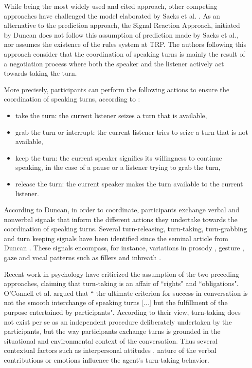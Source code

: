 While being the most widely used and cited approach, other competing approaches have challenged the model elaborated by Sacks et al. \citep{sacks_simplest_1974}.
As an alternative to the prediction approach, the Signal Reaction Approach, initiated by Duncan \citep{duncan_signals_1972} does not follow this assumption of prediction made by Sacks et al., nor assumes the existence of the rules system at TRP. 
The authors following this approach consider that the coordination of speaking turns is mainly the result of a negotiation process where both the speaker and the listener actively act towards taking the turn.

More precisely, participants can perform the following actions to ensure the coordination of speaking turns, according to \citep{bunt_dimensions_2006}:
\begin{itemize}
\item take the turn: the current listener seizes a turn that is available,
\item grab the turn or interrupt: the current listener tries to seize a turn that is not available,
\item keep the turn: the current speaker signifies its willingness to continue speaking, in the case of a pause or a listener trying to grab the turn,
\item release the turn: the current speaker makes the turn available to the current listener.
\end{itemize}

According to Duncan, in order to coordinate, participants exchange verbal and nonverbal signals that inform the different actions they undertake towards the coordination of speaking turns. 
Several turn-releasing, turn-taking, turn-grabbing and turn keeping signals have been identified since the seminal article from Duncan \citep{duncan_signals_1972}. These signals encompass, for instance, variations in prosody \citep{duncan_signals_1972,gravano_turn-taking_2011,hjalmarsson_additive_2011}, gesture \citep{duncan_signals_1972,mondada_multimodal_2007}, gaze \citep{kendon_functions_1967,novick_coordinating_1996,oertel_gaze_2013} and vocal patterns 
such as fillers \citep{benus_pragmatic_2011} and inbreath \citep{torreira_breathing_2015}.  

Recent work in psychology have criticized
the assumption of the two preceding approaches, claiming that turn-taking is an affair of ``rights" and ``obligations". O'Connell et al.\citep{oconnell_turn-taking_1990} argued that `` the ultimate criterion for success in conversation is not the smooth interchange of speaking
turns [...] but the fulfillment of the purpose entertained
by participants". According to their view, turn-taking
does not exist per se as an independent procedure deliberately
undertaken by the participants, but the way
participants exchange turns is grounded in the situational
and environmental context of the conversation.
Thus several contextual factors such as interpersonal attitudes \citep{ter_maat_how_2010}, nature of the verbal contributions \citep{clark_using_1996,cafaro_effects_2016} or emotions \citep{goldberg_interrupting_1990} influence the agent's turn-taking behavior. 


